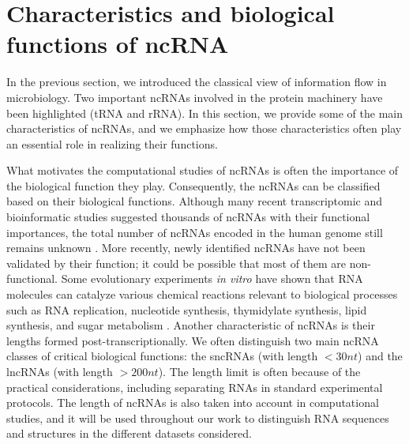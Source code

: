 \section{Characteristics and biological functions of ncRNA} 
\label{sec:biological_function}
In the previous section, we introduced the classical view of information flow in microbiology. Two important \acp{ncRNA} involved in the protein machinery have been highlighted (\ac{tRNA} and \ac{rRNA}). In this section, we provide some of the main characteristics of \acp{ncRNA}, and we emphasize how those characteristics often play an essential role in realizing their functions. 

What motivates the computational studies of \acp{ncRNA} is often the importance of the biological function they play. Consequently, the \acp{ncRNA} can be classified based on their biological functions. Although many recent transcriptomic and bioinformatic studies suggested thousands of \acp{ncRNA} with their functional importances, the total number of \acp{ncRNA} encoded in the human genome still remains unknown \cite{santosh2015non}. More recently, newly identified \acp{ncRNA} have not been validated by their function; it could be possible that most of them are non-functional. Some  evolutionary experiments \textit{in vitro} have shown that \ac{RNA} molecules can catalyze various chemical reactions relevant to biological processes such as \ac{RNA} replication, nucleotide synthesis, thymidylate synthesis, lipid synthesis, and sugar metabolism \cite{robertson1990selection,ellington2009evolutionary}. 
Another characteristic of \acp{ncRNA} is their lengths formed post-transcriptionally. We often distinguish two main \ac{ncRNA} classes of critical biological functions: the \acp{sncRNA} (with length $<30nt$) and the \acp{lncRNA} (with length $>200nt$). The length limit is often because of the practical considerations, including separating \acp{RNA} in standard experimental protocols. The length of \acp{ncRNA} is also taken into account in computational studies, and it will be used throughout our work to distinguish \ac{RNA} sequences and structures in the different datasets considered.

